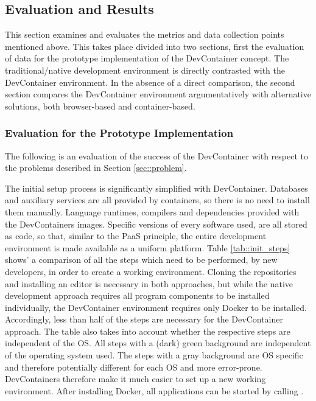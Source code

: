    \subsection{Evaluation and Results}\label{sses::eval_compare}
    This section examines and evaluates the metrics and data collection points mentioned above. This takes place divided into two sections, first the evaluation of data for the prototype implementation of the DevContainer concept. The traditional/native development environment is directly contrasted with the DevContainer environment.
    In the absence of a direct comparison, the second section compares the DevContainer environment argumentatively with alternative solutions, both browser-based and container-based.

        \subsubsection{Evaluation for the Prototype Implementation}
        The following is an evaluation of the success of the DevContainer with respect to the problems described in Section \ref{sec::problem}.

        The initial setup process is significantly simplified with DevContainer. Databases and auxiliary services are all provided by containers, so there is no need to install them manually. Language runtimes, compilers and dependencies provided with the DevContainers images. Specific versions of every software used, are all stored as code, so that, similar to the PaaS principle, the entire development environment is made available as a uniform platform.\newline
        Table \ref{tab::init_steps} shows' a comparison of all the steps which need to be performed, by new developers, in order to create a working environment. Cloning the repositories and installing an editor is necessary in both approaches, but while the native development approach requires all program components to be installed individually, the DevContainer environment requires only Docker to be installed. Accordingly, less than half of the steps are necessary for the DevContainer approach. The table also takes into account whether the respective steps are independent of the \acl{OS}. All steps with a (dark) green background are independent of the operating system used. The steps with a gray background are \acl{OS} specific and therefore potentially different for each \ac{OS} and more error-prone.\newline
        DevContainers therefore make it much easier to set up a new working environment. After installing Docker, all applications can be started by calling .
        

